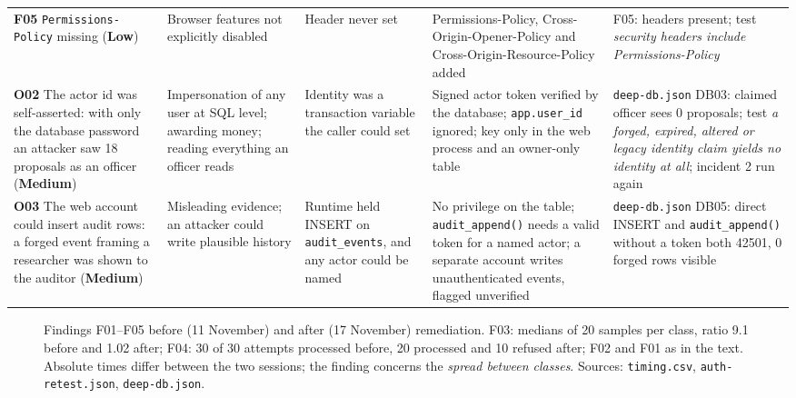 \documentclass[10pt,a4paper]{article}
\newcommand{\code}[1]{\nolinkurl{#1}}
\newcommand{\finding}[1]{\textcolor{danger}{\textbf{#1}}}
\newcommand{\diagram}[3]{\begin{figure}[!htbp]\centering\adjustbox{max width=\linewidth,max height=6.6cm}{}\caption{#2}\label{fig:#3}\end{figure}}
\begin{document}
\begin{center}
\begin{longtable}{@{}L{2.57cm}L{2.21cm}L{2.74cm}L{3.45cm}L{3.45cm}@{}}
\textbf{F05} \code{Permissions-Policy} missing (\finding{Low}) & Browser features not explicitly disabled & Header never set & Permissions-Policy, Cross-Origin-Opener-Policy and Cross-Origin-Resource-Policy added & F05: headers present; test \emph{security headers include Permissions-Policy}\\
\textbf{O02} The actor id was self-asserted: with only the database password an attacker saw 18 proposals as an officer (\finding{Medium}) & Impersonation of any user at SQL level; awarding money; reading everything an officer reads & Identity was a transaction variable the caller could set & Signed actor token verified by the database; \code{app.user_id} ignored; key only in the web process and an owner-only table & \code{deep-db.json} DB03: claimed officer sees 0 proposals; test \emph{a forged, expired, altered or legacy identity claim yields no identity at all}; incident 2 run again\\
\textbf{O03} The web account could insert audit rows: a forged event framing a researcher was shown to the auditor (\finding{Medium}) & Misleading evidence; an attacker could write plausible history & Runtime held INSERT on \code{audit\_events}, and any actor could be named & No privilege on the table; \code{audit\_append()} needs a valid token for a named actor; a separate account writes unauthenticated events, flagged unverified & \code{deep-db.json} DB05: direct INSERT and \code{audit\_append()} without a token both 42501, 0 forged rows visible\\
\bottomrule\end{longtable}\end{center}

\diagram{beforeafter}{Findings F01--F05 before (11 November) and after (17 November) remediation. F03: medians of 20 samples per class, ratio 9.1 before and 1.02 after; F04: 30 of 30 attempts processed before, 20 processed and 10 refused after; F02 and F01 as in the text. Absolute times differ between the two sessions; the finding concerns the \emph{spread between classes}. Sources: \code{timing.csv}, \code{auth-retest.json}, \code{deep-db.json}.}{beforeafter}
\end{document}
